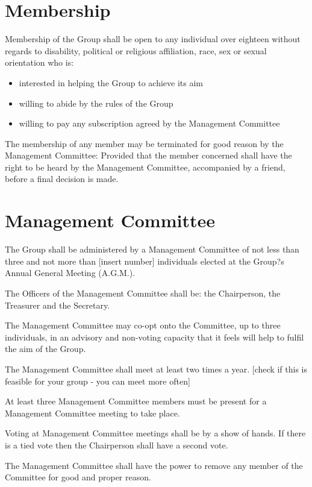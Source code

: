\documentclass[a4paper, 12pt]{report}
\begin{document}
\section{Membership}

Membership of the Group shall be open to any individual over eighteen without regards to disability, political or religious affiliation, race, sex or sexual orientation who is:\\

\begin{itemize}
\item{interested in helping the Group to achieve its aim}
\item{willing to abide by the rules of the Group}
\item{willing to pay any subscription agreed by the Management Committee}
\end{itemize}

The membership of any member may be terminated for good reason by the Management Committee: Provided that the member concerned shall have the right to be heard by the Management Committee, accompanied by a friend, before a final decision is made.\\

\section{Management Committee}

The Group shall be administered by a Management Committee of not less than three and not more than [insert number] individuals elected at the Group?s Annual General Meeting (A.G.M.).

The Officers of the Management Committee shall be: the Chairperson, the Treasurer and the Secretary.

The Management Committee may co-opt onto the Committee, up to three individuals, in an advisory and non-voting capacity that it feels will help to fulfil the aim of the Group.

The Management Committee shall meet at least two times a year. [check if this is feasible for your group - you can meet more often]

At least three Management Committee members must be present for a Management Committee meeting to take place.

Voting at Management Committee meetings shall be by a show of hands. If there is a tied vote then the Chairperson shall have a second vote.

The Management Committee shall have the power to remove any member of the Committee for good and proper reason.
\end{document}
